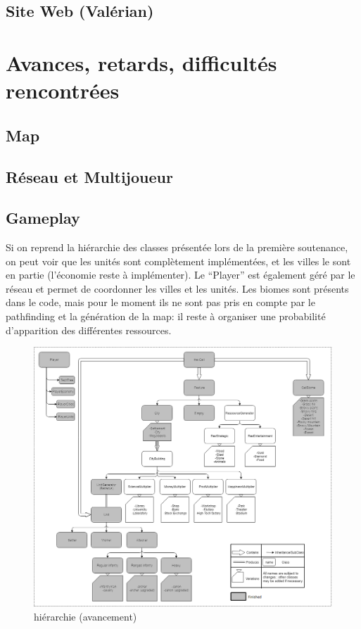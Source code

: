 \documentclass[12pt]{report}
\begin{document}
\section{Site Web (Valérian)}

\chapter{Avances, retards, difficultés rencontrées}

\section*{Map}

\section*{Réseau et Multijoueur}

\section*{Gameplay}

Si on reprend la hiérarchie des classes présentée lors de la première
soutenance, on peut voir que les unités sont complètement implémentées, et les
villes le sont en partie (l’économie reste à implémenter). Le “Player” est
également géré par le réseau et permet de coordonner les villes et les unités.
Les biomes sont présents dans le code, mais pour le moment ils ne sont pas pris
en compte par le pathfinding et la génération de la map: il reste à organiser
une probabilité d’apparition des différentes ressources.

\begin{figure}[H]
    \centering
    \includegraphics[width=1\textwidth]{class_hierarchy}
    \caption{hiérarchie (avancement)}
\end{figure}
\end{document}
